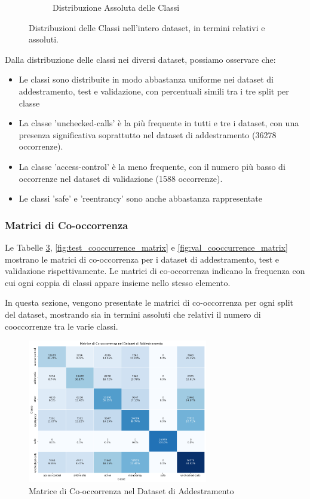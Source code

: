 \documentclass[../../Thesis.tex]{subfiles}
\begin{document}
\begin{figure}[h!]
\begin{subfigure}[b]{0.45\linewidth}
      \caption{Distribuzione Assoluta delle Classi}
      \label{fig:absolute_distribution}
    \end{subfigure}
    \caption{Distribuzioni delle Classi nell'intero dataset, in termini relativi e assoluti.}
    \label{fig:class_distributions}
  \end{figure}
  Dalla distribuzione delle classi nei diversi dataset, possiamo osservare che:

  \begin{itemize}
      \item Le classi sono distribuite in modo abbastanza uniforme nei dataset di addestramento, test e validazione, con percentuali simili tra i tre split per classe
      \item La classe 'unchecked-calls' è la più frequente in tutti e tre i dataset, con una presenza significativa soprattutto nel dataset di addestramento (36278 occorrenze).
      \item La classe 'access-control' è la meno frequente, con il numero più basso di occorrenze nel dataset di validazione (1588 occorrenze).
      \item Le classi 'safe' e 'reentrancy' sono anche abbastanza rappresentate
  \end{itemize}
\subsubsection{Matrici di Co-occorrenza}
Le Tabelle \ref{fig:train_cooccurrence_matrix}, \ref{fig:test_cooccurrence_matrix} e \ref{fig:val_cooccurrence_matrix} mostrano le matrici di co-occorrenza per i dataset di addestramento, test e validazione rispettivamente. Le matrici di co-occorrenza indicano la frequenza con cui ogni coppia di classi appare insieme nello stesso elemento.

In questa sezione, vengono presentate le matrici di co-occorrenza per ogni split del dataset, mostrando sia in termini assoluti che relativi il numero di cooccorrenze tra le varie classi.

\begin{figure}[H]
    \centering
    \includegraphics[width=0.7\textwidth]{../../img/TrainCo-occurrency.png}
    \caption{Matrice di Co-occorrenza nel Dataset di Addestramento}
    \label{fig:train_cooccurrence_matrix}
\end{figure}
\end{document}
